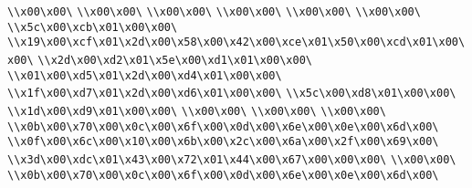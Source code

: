 \verb|\\x00\x00\|\newline
\verb|\\x00\x00\|\newline
\verb|\\x00\x00\|\newline
\verb|\\x00\x00\|\newline
\verb|\\x00\x00\|\newline
\verb|\\x00\x00\|\newline
\verb|\\x5c\x00\xcb\x01\x00\x00\|\newline
\verb|\\x19\x00\xcf\x01\x2d\x00\x58\x00\x42\x00\xce\x01\x50\x00\xcd\x01\x00\x00\|\newline
\verb|\\x2d\x00\xd2\x01\x5e\x00\xd1\x01\x00\x00\|\newline
\verb|\\x01\x00\xd5\x01\x2d\x00\xd4\x01\x00\x00\|\newline
\verb|\\x1f\x00\xd7\x01\x2d\x00\xd6\x01\x00\x00\|\newline
\verb|\\x5c\x00\xd8\x01\x00\x00\|\newline
\verb|\\x1d\x00\xd9\x01\x00\x00\|\newline
\verb|\\x00\x00\|\newline
\verb|\\x00\x00\|\newline
\verb|\\x00\x00\|\newline
\verb|\\x0b\x00\x70\x00\x0c\x00\x6f\x00\x0d\x00\x6e\x00\x0e\x00\x6d\x00\|\newline
\verb|\\x0f\x00\x6c\x00\x10\x00\x6b\x00\x2c\x00\x6a\x00\x2f\x00\x69\x00\|\newline
\verb|\\x3d\x00\xdc\x01\x43\x00\x72\x01\x44\x00\x67\x00\x00\x00\|\newline
\verb|\\x00\x00\|\newline
\verb|\\x0b\x00\x70\x00\x0c\x00\x6f\x00\x0d\x00\x6e\x00\x0e\x00\x6d\x00\|\newline
